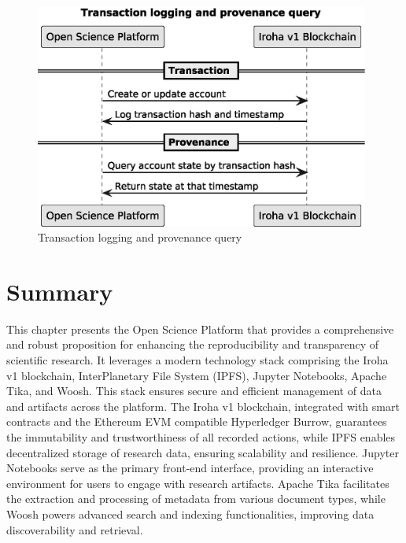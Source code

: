 \documentclass[final]{rc-book-2.14}
\begin{document}
\begin{figure}[htbp]
    \centering
    \includegraphics[width=0.98\textwidth, keepaspectratio]{fig/provenance_timeline.eps}
    \caption{Transaction logging and provenance query}
    \label{fig:provenance}
\end{figure}



\section{Summary}
\label{sec:experiments:summary}

This chapter presents the Open Science Platform that provides a comprehensive and robust proposition for enhancing the reproducibility and transparency of scientific research. It leverages a modern technology stack comprising the Iroha v1 blockchain, InterPlanetary File System (IPFS), Jupyter Notebooks, Apache Tika, and Woosh. This stack ensures secure and efficient management of data and artifacts across the platform. The Iroha v1 blockchain, integrated with smart contracts and the Ethereum EVM compatible Hyperledger Burrow, guarantees the immutability and trustworthiness of all recorded actions, while IPFS enables decentralized storage of research data, ensuring scalability and resilience. Jupyter Notebooks serve as the primary front-end interface, providing an interactive environment for users to engage with research artifacts. Apache Tika facilitates the extraction and processing of metadata from various document types, while Woosh powers advanced search and indexing functionalities, improving data discoverability and retrieval.
\end{document}
